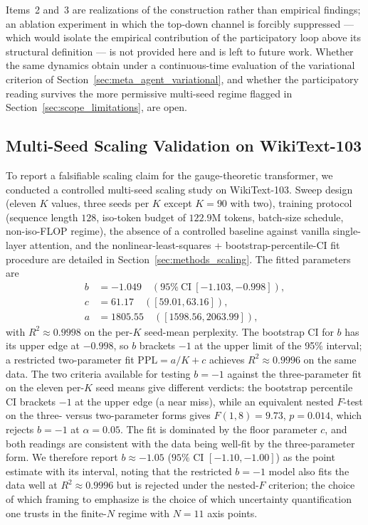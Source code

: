 \documentclass[11pt]{article}
\begin{document}
Items~2 and~3 are realizations of the construction rather than empirical findings; an ablation experiment in which the top-down channel is forcibly suppressed --- which would isolate the empirical contribution of the participatory loop above its structural definition --- is not provided here and is left to future work. Whether the same dynamics obtain under a continuous-time evaluation of the variational criterion of Section~\ref{sec:meta_agent_variational}, and whether the participatory reading survives the more permissive multi-seed regime flagged in Section~\ref{sec:scope_limitations}, are open.

\subsection{Multi-Seed Scaling Validation on WikiText-103}
\label{sec:scaling_validation}

To report a falsifiable scaling claim for the gauge-theoretic transformer, we conducted a controlled multi-seed scaling study on WikiText-103. Sweep design (eleven $K$ values, three seeds per $K$ except $K = 90$ with two), training protocol (sequence length $128$, iso-token budget of $122.9$M tokens, batch-size schedule, non-iso-FLOP regime), the absence of a controlled baseline against vanilla single-layer attention, and the nonlinear-least-squares + bootstrap-percentile-CI fit procedure are detailed in Section~\ref{sec:methods_scaling}. The fitted parameters are
\begin{align*}
b &= -1.049\quad (95\%\ \text{CI}\ [-1.103, -0.998]), \\
c &= 61.17\quad ([59.01, 63.16]), \\
a &= 1805.55\quad ([1598.56, 2063.99]),
\end{align*}
with $R^2 \approx 0.9998$ on the per-$K$ seed-mean perplexity. The bootstrap CI for $b$ has its upper edge at $-0.998$, so $b$ brackets $-1$ at the upper limit of the 95\% interval; a restricted two-parameter fit $\mathrm{PPL} = a/K + c$ achieves $R^2 \approx 0.9996$ on the same data. The two criteria available for testing $b = -1$ against the three-parameter fit on the eleven per-$K$ seed means give different verdicts: the bootstrap percentile CI brackets $-1$ at the upper edge (a near miss), while an equivalent nested $F$-test on the three- versus two-parameter forms gives $F(1, 8) = 9.73$, $p = 0.014$, which rejects $b = -1$ at $\alpha = 0.05$. The fit is dominated by the floor parameter $c$, and both readings are consistent with the data being well-fit by the three-parameter form. We therefore report $b \approx -1.05$ ($95\%$ CI $[-1.10, -1.00]$) as the point estimate with its interval, noting that the restricted $b = -1$ model also fits the data well at $R^2 \approx 0.9996$ but is rejected under the nested-$F$ criterion; the choice of which framing to emphasize is the choice of which uncertainty quantification one trusts in the finite-$N$ regime with $N = 11$ axis points.
\end{document}
